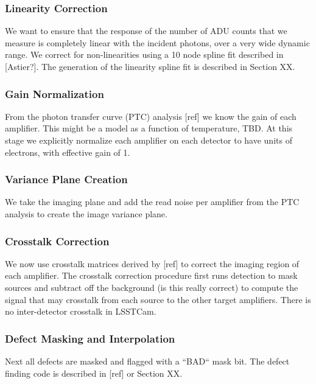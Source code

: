 \documentclass[SE,authoryear,lsstdraft,toc]{lsstdoc}
\begin{document}
\subsubsection{Linearity Correction}

We want to ensure that the response of the number of ADU counts that we measure
is completely linear with the incident photons, over a very wide dynamic
range.  We correct for non-linearities using a 10 node spline fit described in
[Astier?].  The generation of the linearity spline fit is described in Section XX.

\subsubsection{Gain Normalization}

From the photon transfer curve (PTC) analysis [ref] we know the gain of each
amplifier.  This might be a model as a function of temperature, TBD.  At this
stage we explicitly normalize each amplifier on each detector to have units of
electrons, with effective gain of 1.

\subsubsection{Variance Plane Creation}

We take the imaging plane and add the read noise per amplifier from the PTC
analysis to create the image variance plane.

\subsubsection{Crosstalk Correction}

We now use crosstalk matrices derived by [ref] to correct the imaging region of
each amplifier.  The crosstalk correction procedure first runs detection to
mask sources and subtract off the background (is this really correct) to
compute the signal that may crosstalk from each source to the other target
amplifiers.  There is no inter-detector crosstalk in LSSTCam.

\subsubsection{Defect Masking and Interpolation}

Next all defects are masked and flagged with a ``BAD`` mask bit.  The defect
finding code is described in [ref] or Section XX.
\end{document}

